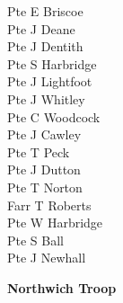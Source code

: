 \begin{multicols}{3}
  Pte E Briscoe \\
  Pte J Deane \\
  Pte J Dentith \\
  Pte S Harbridge \\
  Pte J Lightfoot \\
  Pte J Whitley \\
  Pte C Woodcock \\
  Pte J Cawley \\
  Pte T Peck \\
  Pte J Dutton \\
  Pte T Norton \\
  Farr T Roberts \\
  Pte W Harbridge \\
  Pte S Ball \\
  Pte J Newhall \\
\end{multicols}

\vspace*{10mm}

\begin{center}
  \Large
  \textbf{Northwich Troop}
\end{center}

\vspace*{10mm}

